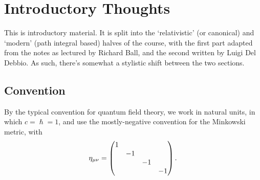 \documentclass[notes]{subfiles}
\begin{document}
\chapter*{Introductory Thoughts}
\label{chap:intro}
This is introductory material. It is split into the `relativistic' (or canonical) and `modern' (path integral based) halves of the course, with the first part adapted from the notes as lectured by Richard Ball, and the second written by Luigi Del Debbio.
As such, there's somewhat a stylistic shift between the two sections.

\section*{Convention}
By the typical convention for quantum field theory, we work in natural units, in which $c = \hslash = 1$, and use the mostly-negative convention for the Minkowski metric, with 
\begin{equation*}
    \eta_{\mu\nu} = \begin{pmatrix}
        \dmat{1, -1, -1, -1}
    \end{pmatrix}.
\end{equation*}
\end{document}
